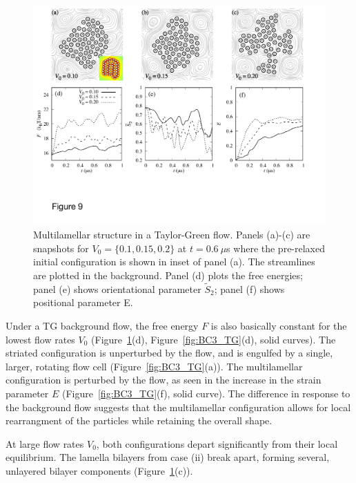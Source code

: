 \documentclass[prb,preprint,showpacs,preprintnumbers,amsmath,amssymb,longbibliography]{revtex4-1}
\begin{document}
\begin{figure}
  \begin{center}
\includegraphics[width=1.0\textwidth]{Figures/Figure9.pdf}    
  \end{center}
  \vspace{-20pt}  
  \caption{\label{fig:BC2_TG} 
Multilamellar structure in a Taylor-Green flow. Panels (a)-(c) are snapshots for $V_0 = \{0.1, 0.15, 0.2\}$ at $t=0.6\ \mu$s where the pre-relaxed initial configuration is shown in inset of panel (a). The streamlines are plotted in the background.
Panel (d) plots the free energies; panel (e) shows orientational parameter $\tilde{S}_2$; panel (f) shows positional parameter E.
 }
\end{figure}


Under a TG background flow, the free energy $F$ 
is also basically constant for the lowest flow rates $V_0$
(Figure~\ref{fig:BC2_TG}(d), Figure~\ref{fig:BC3_TG}(d), solid curves).
The striated configuration is unperturbed by the flow, and is engulfed by a single,
larger, rotating flow cell
(Figure~\ref{fig:BC3_TG}(a)). 
The multilamellar configuration is perturbed by the flow, as seen in the increase in
the strain parameter $E$ (Figure~\ref{fig:BC3_TG}(f), solid curve).
The difference in response to the background flow
suggests that the multilamellar configuration
allows for local rearrangment of the particles while retaining the overall shape.

At large flow rates $V_0$, both configurations depart significantly from their local
equilibrium.  The lamella bilayers from case (ii) break apart, forming several,
unlayered bilayer components (Figure~\ref{fig:BC2_TG}(c)).
\end{document}
